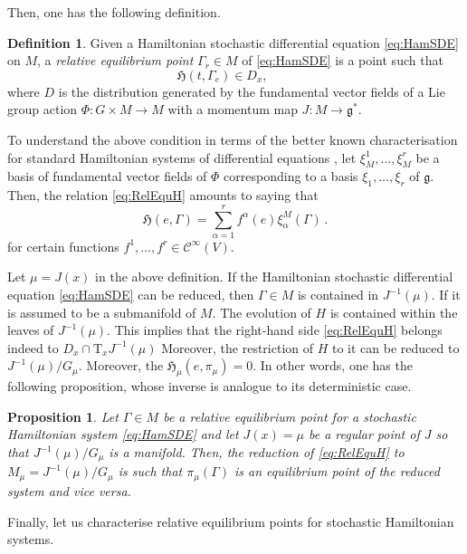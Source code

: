 \documentclass[11pt]{article}
\theoremstyle{plain}
\newtheorem{proposition}[theorem]{Proposition}
\theoremstyle{definition}
\newtheorem{definition}[theorem]{Definition}
\newcommand{\Cinfty}{\mathscr{C}^\infty}
\newcommand{\T}{\mathrm{T}}
\begin{document}
Then, one has the following definition.

\begin{definition} Given a Hamiltonian  stochastic differential equation \eqref{eq:HamSDE} on $M$, a {\it relative equilibrium point}  $\Gamma_r\in M$ of \eqref{eq:HamSDE} is a point such that
\begin{equation}\label{eq:RelEquH}
\mathfrak{H}(t,\Gamma_e)\in D_x,\qquad  
\end{equation}
where $D$ is the distribution generated by the fundamental vector fields of a Lie group action $\Phi:G\times M\rightarrow M$ with a momentum map $J:M\rightarrow \mathfrak{g}^*$.
\end{definition}

To understand the above condition in terms of the better known characterisation for standard Hamiltonian systems of differential equations \cite{MS88}, let   $\xi_M^1,\ldots, \xi^r_M$ be a basis of fundamental vector fields of $\Phi$ corresponding to a basis  $\xi_1,\ldots,\xi_r$ of $\mathfrak{g}$. Then, the relation \eqref{eq:RelEquH} amounts to saying that
$$
\mathfrak{H}(e,\Gamma)=\sum_{\alpha=1}^rf^\alpha (e)\xi_\alpha^M(\Gamma)\,.
$$
for certain functions $f^1,\ldots,f^r\in \Cinfty(V)$. 

Let $\mu=J(x)$ in the above definition. If the Hamiltonian stochastic differential equation \eqref{eq:HamSDE} can be reduced, then $\Gamma\in M$ is contained in $J^{-1}(\mu)$. If it is assumed to be a submanifold of $M$. The evolution of $H$ is contained within the leaves of $J^{-1}(\mu)$. This implies that the right-hand side \eqref{eq:RelEquH} belongs indeed to $D_x\cap \T_xJ^{-1}(\mu)$ Moreover, the restriction of $H$ to it can be reduced to  $J^{-1}(\mu)/G_\mu$. Moreover, the $\mathfrak{H}_\mu(e,\pi_\mu)=0$. In other words, one has the following proposition, whose inverse is analogue to its deterministic case.

\begin{proposition} Let $\Gamma\in M$ be a relative equilibrium point for a stochastic Hamiltonian system \eqref{eq:HamSDE} and let $J(x)=\mu$ be a regular point of $J$ so that $J^{-1}(\mu)/G_\mu$ is a manifold. Then, the reduction of \eqref{eq:RelEquH} to $M_\mu=J^{-1}(\mu)/G_\mu$  is such that $\pi_\mu(\Gamma)$ is an equilibrium point of the reduced system and vice versa.
\end{proposition}

Finally, let us characterise relative equilibrium points for stochastic Hamiltonian systems.
\end{document}
